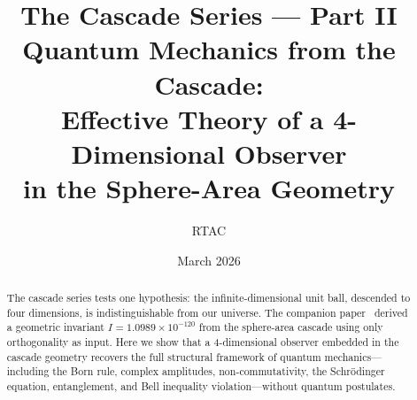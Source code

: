 \documentclass[12pt,a4paper]{article}
\title{The Cascade Series --- Part II\\[0.5em]
\large Quantum Mechanics from the Cascade:\\
Effective Theory of a 4-Dimensional Observer\\
in the Sphere-Area Geometry}
\author{RTAC}
\date{March 2026}
\begin{document}
\setlength{\emergencystretch}{3em}
\maketitle
{}
\label{paperdoc}

\begin{abstract}
The cascade series tests one hypothesis: the infinite-dimensional unit ball, descended to
four dimensions, is indistinguishable from our universe. The companion paper~\cite{part0}
derived a geometric invariant $I = 1.0989\times 10^{-120}$ from the sphere-area cascade
using only orthogonality as input. Here we show that a 4-dimensional observer embedded in
the cascade geometry recovers the full structural framework of quantum mechanics---including
the Born rule, complex amplitudes, non-commutativity, the Schr\"{o}dinger equation,
entanglement, and Bell inequality violation---without quantum postulates.


\end{abstract}
\end{document}
